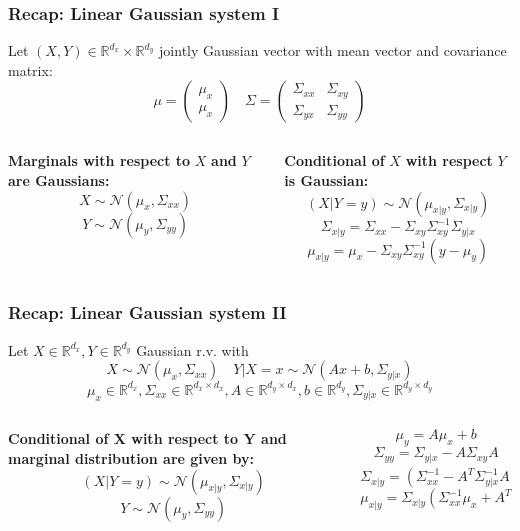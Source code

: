 \documentclass[xcolor=dvipsnames, compress]{beamer}
\newcommand{\R}{\ensuremath{\mathbb{R}}}
\begin{document}
\begin{frame}
\frametitle{Recap: Linear Gaussian system I}
Let $(X,Y) \in \R^{d_x} \times \R^{d_y}$ jointly Gaussian vector with mean vector and covariance matrix: $$ \mu = \left(\begin{matrix}\mu_x\\\mu_x\end{matrix}\right) \quad \Sigma = \left(\begin{matrix}\Sigma_{xx} & \Sigma_{xy} \\ \Sigma_{yx} & \Sigma_{yy} \end{matrix}\right)  $$
\begin{columns}
	\begin{column}{0.5\textwidth}
		\textbf{Marginals with respect to }$X$ \textbf{and} $Y$ \textbf{are Gaussians:}
		$$X \sim  \mathcal{N}(\mu_x, \Sigma_{xx}) $$
		$$Y \sim  \mathcal{N}(\mu_y, \Sigma_{yy})$$
		
	\end{column}
	\begin{column}{0.5\textwidth}  %
		\textbf{Conditional of }$X$ \textbf{with respect } $Y$ \textbf{is Gaussian:}
		$$(X|Y = y) \sim  \mathcal{N}(\mu_{x|y}, \Sigma_{x|y})$$
		$$ \Sigma_{x|y} = \Sigma_{xx} - \Sigma_{xy} \Sigma_{xy}^{-1} \Sigma_{y|x}$$
		$$ \mu_{x|y} = \mu_{x} - \Sigma_{xy} \Sigma_{xy}^{-1} (y-\mu_y)$$
	\end{column}
\end{columns}
\end{frame}

\begin{frame}
\frametitle{Recap: Linear Gaussian system II}
Let $X \in \R^{d_x}, Y \in \R^{d_y}$ Gaussian r.v. with $$ X \sim \mathcal{N}(\mu_x, \Sigma_{xx})  \quad  Y|X=x \sim \mathcal{N}(Ax+b, \Sigma_{y|x})  $$
$$\mu_x \in \R^{d_x}, \Sigma_{xx} \in \R^{d_x \times d_x}, A \in \R^{d_y \times d_x}, b \in \R^{d_y},  \Sigma_{y|x} \in \R^{d_y \times d_y}$$
\begin{columns}
	\begin{column}{0.5\textwidth}
		\textbf{Conditional of X with respect to Y and marginal distribution are given by:}
		$$(X|Y=y) \sim  \mathcal{N}(\mu_{x|y}, \Sigma_{x|y}) $$
		$$Y \sim  \mathcal{N}(\mu_y, \Sigma_{yy})$$
		
	\end{column}
	\begin{column}{0.5\textwidth}  %
		$$\mu_y = A \mu_x + b$$
		$$ \Sigma_{yy} = \Sigma_{y|x} - A \Sigma_{xy}A$$
		$$ \Sigma_{x|y} = (\Sigma_{xx}^{-1} - A^T \Sigma_{y|x}^{-1}A)^{-1}$$
		$$ \mu_{x|y} = \Sigma_{x|y} (\Sigma_{xx}^{-1} \mu_x + A^T \Sigma_{y|x}^{-1} (y-b))$$
	\end{column}
\end{columns}
\end{frame}
\end{document}

